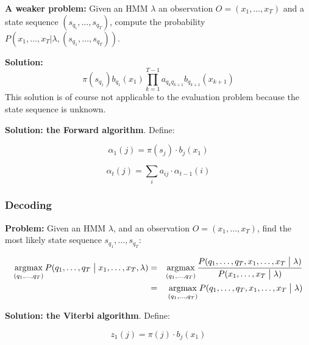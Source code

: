 \documentclass[11pt]{article}
\DeclareMathOperator*{\argmax}{\arg\!\max}
\begin{document}
\vspace{10pt}

\textbf{A weaker problem:} Given an HMM $\lambda$ an observation $O = (x_1, \ldots, x_T)$ and a state sequence $(s_{q_i}, \ldots, s_{q_T})$, compute the probability $P(x_1, \ldots, x_T | \lambda, (s_{q_1}, \ldots, s_{q_T}))$.

\vspace{5pt}

\textbf{Solution:}
\begin{equation}
    \pi(s_{q_1}) b_{q_1}(x_1) \prod\limits_{k = 1}^{T - 1} a_{q_{k}q_{k+1}} b_{q_{k+1}}(x_{k+1})
\end{equation}
This solution is of course not applicable to the evaluation problem because the state sequence is unknown.

\vspace{10pt}

\textbf{Solution: the Forward algorithm}. Define:

\begin{equation}
    \alpha_1(j) = \pi(s_j) \cdot b_j(x_1)
\end{equation}

\begin{equation}
    \alpha_t(j) = \sum\limits_i a_{ij} \cdot \alpha_{t-1}(i)
\end{equation}

\subsubsection{Decoding}

\textbf{Problem:} Given an HMM $\lambda$, and an observation $O = (x_1, \ldots, x_T)$, find the most likely state sequence $s_{q_1}, \ldots, s_{q_T}$:

\begin{eqnarray*}
    \argmax_{(q_1, \ldots, q_T)} P(q_1, \ldots, q_T \bigm| x_1, \ldots, x_T, \lambda)
    &=& \argmax_{(q_1, \ldots, q_T)} \frac{P(q_1, \ldots, q_T, x_1, \ldots, x_T \bigm| \lambda)}{P(x_1, \ldots, x_T \bigm| \lambda)} \\
    &=& \argmax_{(q_1, \ldots, q_T)} P(q_1, \ldots, q_T, x_1, \ldots, x_T \bigm| \lambda)
\end{eqnarray*}

\textbf{Solution: the Viterbi algorithm}. Define:

\begin{equation}
    z_1(j) = \pi(j) \cdot b_j(x_1)
\end{equation}
\end{document}
